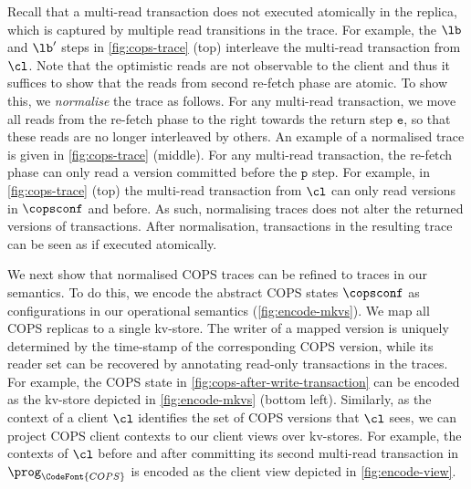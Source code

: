 Recall that a multi-read transaction does not executed atomically in the replica,
which is captured by multiple read transitions in the trace.
For example, the \( \lb\) and \( \lb' \) steps in \cref{fig:cops-trace} (top)
interleave the multi-read transaction from \( \cl \).
Note that the optimistic reads are not observable to the client and
thus it suffices to show that the reads from second re-fetch phase are atomic.
To show this, we \emph{normalise} the trace as follows. 
For any multi-read transaction, 
we move all reads from the re-fetch phase to the right towards the return step \( \mathtt{e}\),
so that these reads are no longer interleaved by others.
An example of a normalised trace is given in \cref{fig:cops-trace} (middle).
For any multi-read transaction,
the re-fetch phase can only read a version committed before the \( \mathtt{p}\) step.
For example, in \cref{fig:cops-trace} (top)
the multi-read transaction from \( \cl \) can only read versions in \( \copsconf \) and before.
As such, normalising traces does not alter the returned versions of transactions.
After normalisation, transactions in the resulting trace can be seen as if executed atomically. 

We next show that normalised COPS traces can be refined to traces in our semantics.
To do this, we encode the abstract COPS states \(\copsconf \) as configurations
in our operational semantics (\cref{fig:encode-mkvs}). 
We map all COPS replicas to a single kv-store.
The writer of a mapped version is uniquely
determined by the time-stamp of the corresponding COPS version, 
while its reader set 
can be recovered by annotating read-only transactions in the traces.
For example, the COPS state in \cref{fig:cops-after-write-transaction}
can be encoded as the kv-store depicted in \cref{fig:encode-mkvs} (bottom left).
Similarly, as the context of a client $\cl$ identifies the set of COPS versions that $\cl$ sees, 
we can project COPS client contexts to our client views over kv-stores. 
For example, the contexts of \( \cl \) 
before and after committing its second multi-read transaction in \( \prog_{\CodeFont{COPS}} \) 
is encoded as the client view depicted in \cref{fig:encode-view}.



